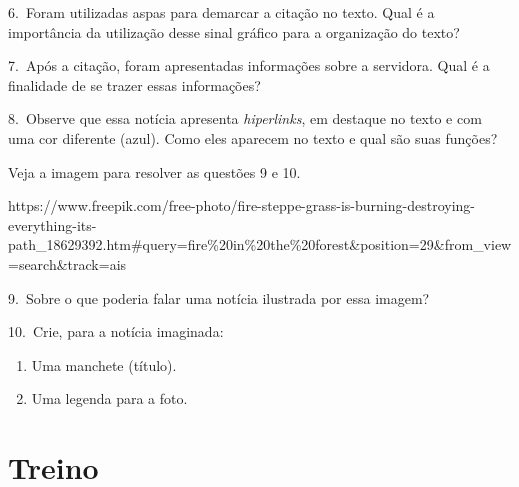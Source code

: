 \begin{itemize}
6.~Foram utilizadas aspas para demarcar a citação no texto. Qual é a
importância da utilização desse sinal gráfico para a organização do
texto?



7.~Após a citação, foram apresentadas informações sobre a servidora.
Qual é a finalidade de se trazer essas informações?



8.~Observe que essa notícia apresenta \emph{hiperlinks}, em destaque no
texto e com uma cor diferente (azul). Como eles aparecem no texto e qual
são suas funções?



Veja a imagem para resolver as questões 9 e 10.

https://www.freepik.com/free-photo/fire-steppe-grass-is-burning-destroying-everything-its-path\_18629392.htm\#query=fire\%20in\%20the\%20forest\&position=29\&from\_view=search\&track=ais

9.~Sobre o que poderia falar uma notícia ilustrada por essa imagem?



10.~Crie, para a notícia imaginada:

\begin{enumerate}
\def\labelenumi{\arabic{enumi}.}
\tightlist
\item
  Uma manchete (título).
\item
  Uma legenda para a foto.
\end{enumerate}



\section{Treino}


\end{itemize}
